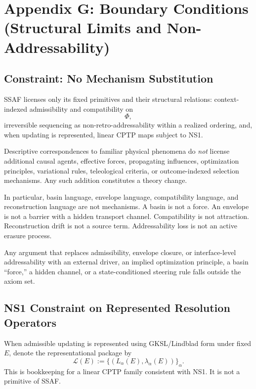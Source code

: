 \documentclass[aps,prx,onecolumn,11pt]{revtex4-2}
\theoremstyle{plain}
\theoremstyle{definition}
\theoremstyle{remark}
\begin{document}
\section{Appendix G: Boundary Conditions (Structural Limits and Non-Addressability)}
\label{app:boundary_conditions_limits}

\subsection{Constraint: No Mechanism Substitution}
\label{app:no_mechanism_substitution}

SSAF licenses only its fixed primitives and their structural relations:
context-indexed admissibility and compatibility on
\[
\Phi,
\]
irreversible sequencing as non-retro-addressability within a realized
ordering, and, when updating is represented, linear CPTP maps subject
to NS1.

Descriptive correspondences to familiar physical phenomena do
\emph{not} license additional causal agents, effective forces,
propagating influences, optimization principles, variational rules,
teleological criteria, or outcome-indexed selection mechanisms. Any
such addition constitutes a theory change.

In particular, basin language, envelope language, compatibility
language, and reconstruction language are not mechanisms. A basin is
not a force. An envelope is not a barrier with a hidden transport
channel. Compatibility is not attraction. Reconstruction drift is not a
source term. Addressability loss is not an active erasure process.

Any argument that replaces admissibility, envelope closure, or
interface-level addressability with an external driver, an implied
optimization principle, a basin ``force,'' a hidden channel, or a
state-conditioned steering rule falls outside the axiom set.

\subsection{NS1 Constraint on Represented Resolution Operators}
\label{subsec:resolution_operator_families_ns1}

When admissible updating is represented using GKSL/Lindblad form under
fixed \(E\), denote the representational package by
\[
\mathcal L(E)
:=
\{(L_\alpha(E),\lambda_\alpha(E))\}_\alpha .
\]
This is bookkeeping for a linear CPTP family consistent with NS1. It is
not a primitive of SSAF.
\end{document}
